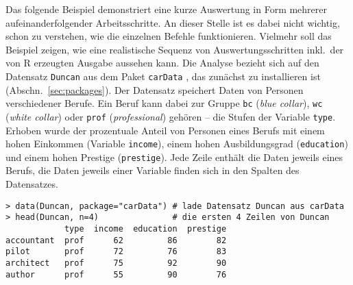 Das folgende Beispiel demonstriert eine kurze Auswertung in Form mehrerer aufeinanderfolgender Arbeitsschritte. An dieser Stelle ist es dabei nicht wichtig, schon zu verstehen, wie die einzelnen Befehle funktionieren. Vielmehr soll das Beispiel zeigen, wie eine realistische Sequenz von Auswertungsschritten inkl.\ der von R erzeugten Ausgabe aussehen kann. Die Analyse bezieht sich auf den Datensatz \lstinline!Duncan! aus dem Paket \lstinline!carData! \cite{Fox2019}, das zunächst zu installieren ist (Abschn.\ \ref{sec:packages}). Der Datensatz speichert Daten von Personen verschiedener Berufe. Ein Beruf kann dabei zur Gruppe \lstinline!bc! (\emph{blue collar}), \lstinline!wc! (\emph{white collar}) oder \lstinline!prof! (\emph{professional}) gehören -- die Stufen der Variable \lstinline!type!. Erhoben wurde der prozentuale Anteil von Personen eines Berufs mit einem hohen Einkommen (Variable \lstinline!income!), einem hohen Ausbildungsgrad (\lstinline!education!) und einem hohen Prestige (\lstinline!prestige!). Jede Zeile enthält die Daten jeweils eines Berufs, die Daten jeweils einer Variable finden sich in den Spalten des Datensatzes.

\begin{lstlisting}
> data(Duncan, package="carData") # lade Datensatz Duncan aus carData
> head(Duncan, n=4)               # die ersten 4 Zeilen von Duncan
            type  income  education  prestige
accountant  prof      62         86        82
pilot       prof      72         76        83
architect   prof      75         92        90
author      prof      55         90        76
\end{lstlisting}

